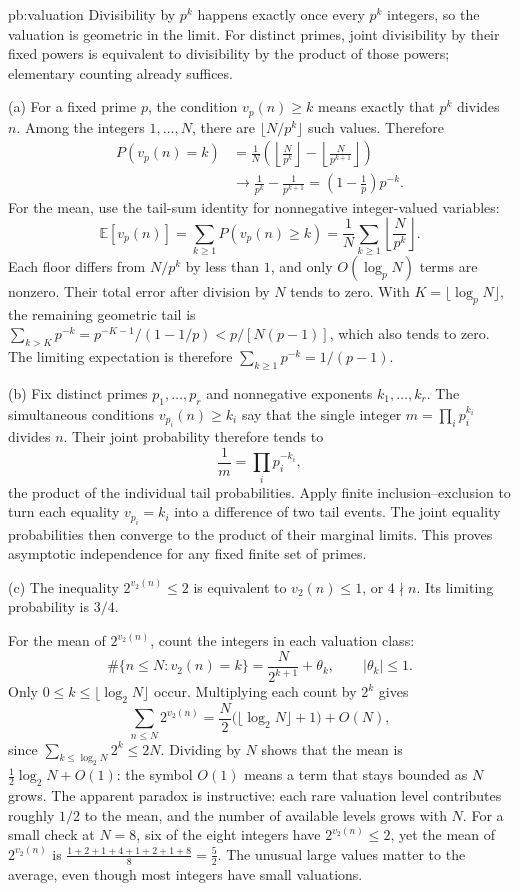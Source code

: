 \begin{solution}{pb:valuation}
\idea Divisibility by $p^k$ happens exactly once every $p^k$ integers, so the valuation is geometric in the limit. For distinct primes, joint divisibility by their fixed powers is
equivalent to divisibility by the product of those powers; elementary
counting already suffices.

\writeup (a) For a fixed prime $p$, the condition $v_p(n)\ge k$ means exactly that $p^k$ divides $n$. Among the integers $1,\ldots,N$, there are $\lfloor N/p^k\rfloor$ such values. Therefore
\[
\begin{aligned}
P(v_p(n)=k)
&=\frac1N\left(
\left\lfloor\frac N{p^k}\right\rfloor-
\left\lfloor\frac N{p^{k+1}}\right\rfloor\right)\\
&\longrightarrow \frac1{p^k}-\frac1{p^{k+1}}
=\left(1-\frac1p\right)p^{-k}.
\end{aligned}
\]
For the mean, use the tail-sum identity for nonnegative integer-valued variables:
\[
\mathbb E[v_p(n)]
=\sum_{k\ge1}P(v_p(n)\ge k)
=\frac1N\sum_{k\ge1}\left\lfloor\frac N{p^k}\right\rfloor.
\]
Each floor differs from $N/p^k$ by less than $1$, and only $O(\log_p N)$ terms are nonzero. Their total error after division by $N$ tends to zero. With $K=\lfloor\log_p N\rfloor$, the remaining geometric tail is $\sum_{k>K}p^{-k}=p^{-K-1}/(1-1/p)<p/[N(p-1)]$, which also tends to zero. The limiting expectation is therefore $\sum_{k\ge1}p^{-k}=1/(p-1)$.

(b) Fix distinct primes $p_1,\ldots,p_r$ and nonnegative exponents $k_1,\ldots,k_r$. The simultaneous conditions $v_{p_i}(n)\ge k_i$ say that the single integer $m=\prod_i p_i^{k_i}$ divides $n$. Their joint probability therefore tends to
\[
\frac1m=\prod_i p_i^{-k_i},
\]
the product of the individual tail probabilities. Apply finite inclusion--exclusion to turn each equality $v_{p_i}=k_i$ into a difference of two tail events. The joint equality probabilities then converge to the product of their marginal limits. This proves asymptotic independence for any fixed finite set of primes.

(c) The inequality $2^{v_2(n)}\le2$ is equivalent to $v_2(n)\le1$, or $4\nmid n$. Its limiting probability is $3/4$.

For the mean of $2^{v_2(n)}$, count the integers in each valuation class:
\[
\#\{n\le N:v_2(n)=k\}
=\frac{N}{2^{k+1}}+\theta_k,\qquad |\theta_k|\le1.
\]
Only $0\le k\le\lfloor\log_2N\rfloor$ occur. Multiplying each count by $2^k$ gives
\[
\sum_{n\le N}2^{v_2(n)}
=\frac N2\bigl(\lfloor\log_2N\rfloor+1\bigr)+O(N),
\]
since $\sum_{k\le\log_2N}2^k\le2N$. Dividing by $N$ shows that the mean is $\frac12\log_2N+O(1)$: the symbol $O(1)$ means a term that stays bounded as $N$ grows. The apparent paradox is instructive: each rare valuation level contributes roughly $1/2$ to the mean, and the number of available levels grows with $N$. For a small check at $N=8$, six of the eight integers have $2^{v_2(n)}\le2$, yet the mean of $2^{v_2(n)}$ is $\frac{1+2+1+4+1+2+1+8}{8}=\frac52$. The unusual large values matter to the average, even though most integers have small valuations.


\end{solution}
